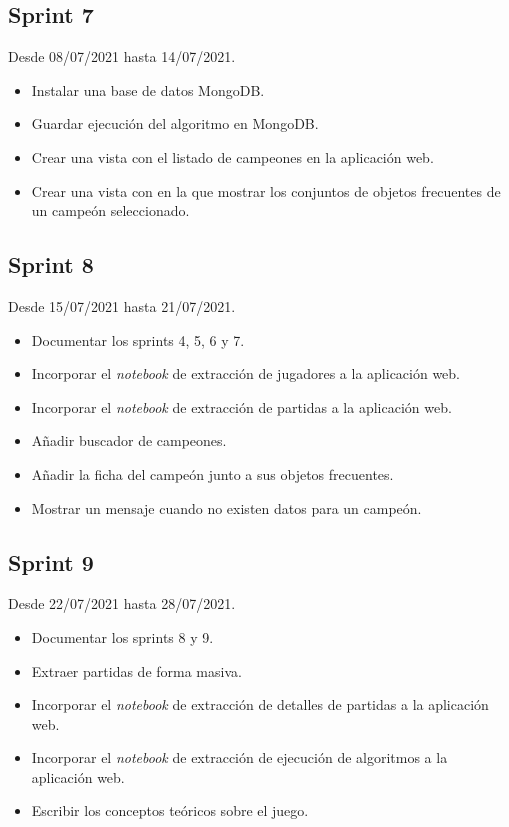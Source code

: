\subsection{Sprint 7}

Desde 08/07/2021 hasta 14/07/2021.

\begin{itemize}
    \item Instalar una base de datos MongoDB.
    \item Guardar ejecución del algoritmo en MongoDB.
    \item Crear una vista con el listado de campeones en la aplicación web.
    \item Crear una vista con en la que mostrar los conjuntos de objetos frecuentes de un campeón seleccionado.
\end{itemize}

\subsection{Sprint 8}

Desde 15/07/2021 hasta 21/07/2021.

\begin{itemize}
    \item Documentar los sprints 4, 5, 6 y 7.
    \item Incorporar el \textit{notebook} de extracción de jugadores a la aplicación web.
 	\item Incorporar el \textit{notebook} de extracción de partidas a la aplicación web.
 	\item Añadir buscador de campeones.
 	\item Añadir la ficha del campeón junto a sus objetos frecuentes.
 	\item Mostrar un mensaje cuando no existen datos para un campeón.
\end{itemize}

\subsection{Sprint 9}

Desde 22/07/2021 hasta 28/07/2021.

\begin{itemize}
	\item Documentar los sprints 8 y 9.
	\item Extraer partidas de forma masiva.
    \item Incorporar el \textit{notebook} de extracción de detalles de partidas a la aplicación web.
    \item Incorporar el \textit{notebook} de extracción de ejecución de algoritmos a la aplicación web.
    \item Escribir los conceptos teóricos sobre el juego.
\end{itemize}


